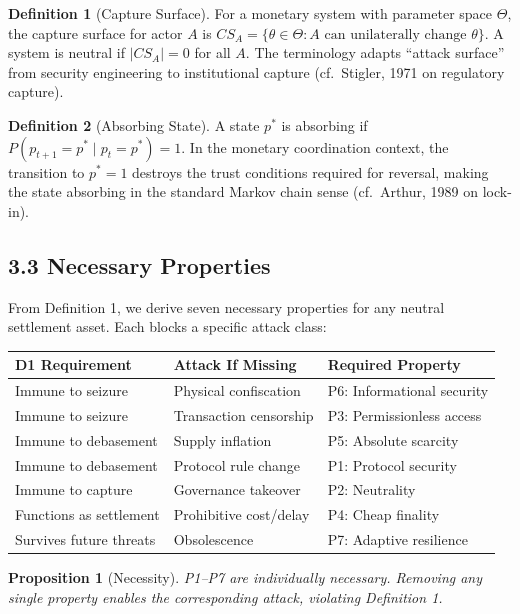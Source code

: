 \documentclass[12pt]{article}
\newtheorem{proposition}{Proposition}
\theoremstyle{definition}
\newtheorem{definition}{Definition}
\theoremstyle{remark}
\begin{document}
\begin{definition}[Capture Surface]
For a monetary system with parameter space $\Theta$, the capture surface
for actor $A$ is $CS_A = \{\theta \in \Theta : A \text{ can unilaterally change } \theta\}$.
A system is neutral if $|CS_A| = 0$ for all $A$. The terminology adapts
``attack surface'' from security engineering to institutional capture
(cf.\ Stigler, 1971 on regulatory capture).
\end{definition}

\begin{definition}[Absorbing State]
A state $p^*$ is absorbing if $P(p_{t+1} = p^* \mid p_t = p^*) = 1$. In
the monetary coordination context, the transition to $p^* = 1$ destroys
the trust conditions required for reversal, making the state absorbing
in the standard Markov chain sense (cf.\ Arthur, 1989 on lock-in).
\end{definition}

\subsection{3.3 Necessary Properties}

From Definition 1, we derive seven necessary properties for any neutral
settlement asset. Each blocks a specific attack class:

\begin{table}[h]
\centering
\begin{tabular}{lll}
\toprule
D1 Requirement & Attack If Missing & Required Property \\
\midrule
Immune to seizure & Physical confiscation & P6: Informational security \\
Immune to seizure & Transaction censorship & P3: Permissionless access \\
Immune to debasement & Supply inflation & P5: Absolute scarcity \\
Immune to debasement & Protocol rule change & P1: Protocol security \\
Immune to capture & Governance takeover & P2: Neutrality \\
Functions as settlement & Prohibitive cost/delay & P4: Cheap finality \\
Survives future threats & Obsolescence & P7: Adaptive resilience \\
\bottomrule
\end{tabular}
\end{table}

\begin{proposition}[Necessity]
P1--P7 are individually necessary. Removing any single property enables
the corresponding attack, violating Definition 1.
\end{proposition}
\end{document}
